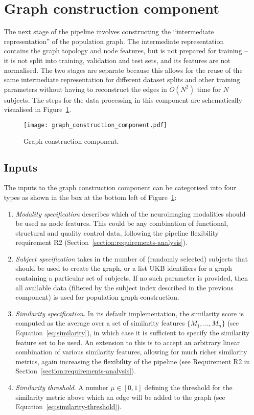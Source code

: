 \section{Graph construction component}
\label{section:graph-construction}
The next stage of the pipeline involves constructing the ``intermediate representation'' of the population graph. The intermediate representation contains the graph topology and node features, but is not prepared for training – it is not split into training, validation and test sets, and its features are not normalised. The two stages are separate because this allows for the reuse of the same intermediate representation for different dataset splits and other training parameters without having to reconstruct the edges in $O(N^2)$ time for $N$ subjects. The steps for the data processing in this component are schematically visualised in Figure~\ref{graph-construction-component}.

\begin{figure}[h]
    \texttt{[image: graph\_construction\_component.pdf]}
    \caption{Graph construction component.}\label{graph-construction-component}
\end{figure}

\subsection{Inputs}
The inputs to the graph construction component can be categorised into four types as shown in the box at the bottom left of Figure~\ref{graph-construction-component}:
\begin{enumerate}
    \item \textit{Modality specification} describes which of the neuroimaging modalities should be used as node features. This could be any combination of functional, structural and quality control data, following the pipeline flexibility requirement R2 (Section~\ref{section:requirements-analysis}).
    \item \textit{Subject specification} takes in the number of (randomly selected) subjects that should be used to create the graph, or a list UKB identifiers for a graph containing a particular set of subjects. If no such parameter is provided, then all available data (filtered by the subject index described in the previous component) is used for population graph construction.
    \item \textit{Similarity specification}. 
    In its default implementation, the similarity score is computed as the average over a set of similarity features $\{M_1, \dots, M_n\}$ (see Equation~\eqref{eq:similarity}), in which case it is sufficient to specify the similarity feature set to be used. An extension to this is to accept an arbitrary linear combination of various similarity features, allowing for much richer similarity metrics, again increasing the flexibility of the pipeline (see Requirement R2 in Section~\ref{section:requirements-analysis}). 
    \item \textit{Similarity threshold}. A number $\mu \in [0,1]$ defining the threshold for the similarity metric above which an edge will be added to the graph (see Equation~\eqref{eq:similarity-threshold}).
\end{enumerate}


